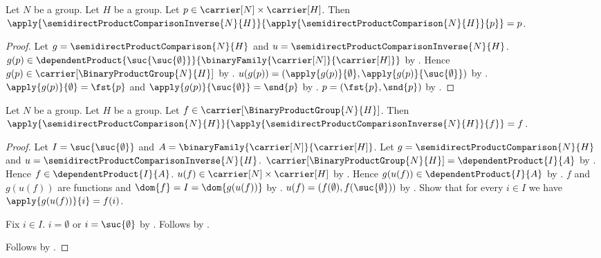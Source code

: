 \begin{proposition}\label{semidirect_product_comparison_inverse_left}
    Let $N$ be a group.
    Let $H$ be a group.
    Let $p\in\carrier[N]\times\carrier[H]$.
    Then
        $\apply{\semidirectProductComparisonInverse{N}{H}}
            {\apply{\semidirectProductComparison{N}{H}}{p}}=p$.
\end{proposition}
\begin{proof}
    Let $g=\semidirectProductComparison{N}{H}$ and
        $u=\semidirectProductComparisonInverse{N}{H}$.
    $g(p)\in\dependentProduct
        {\suc{\suc{\emptyset}}}
        {\binaryFamily{\carrier[N]}{\carrier[H]}}$ by
        .
    Hence $g(p)\in\carrier[\BinaryProductGroup{N}{H}]$ by
        .
    $u(g(p))=
        (\apply{g(p)}{\emptyset},\apply{g(p)}{\suc{\emptyset}})$ by
        .
    $\apply{g(p)}{\emptyset}=\fst{p}$ and
        $\apply{g(p)}{\suc{\emptyset}}=\snd{p}$ by
        .
    $p=(\fst{p},\snd{p})$ by
        .
\end{proof}

\begin{proposition}\label{semidirect_product_comparison_inverse_right}
    Let $N$ be a group.
    Let $H$ be a group.
    Let $f\in\carrier[\BinaryProductGroup{N}{H}]$.
    Then
        $\apply{\semidirectProductComparison{N}{H}}
            {\apply{\semidirectProductComparisonInverse{N}{H}}{f}}=f$.
\end{proposition}
\begin{proof}
    Let $I=\suc{\suc{\emptyset}}$ and
        $A=\binaryFamily{\carrier[N]}{\carrier[H]}$.
    Let $g=\semidirectProductComparison{N}{H}$ and
        $u=\semidirectProductComparisonInverse{N}{H}$.
    $\carrier[\BinaryProductGroup{N}{H}]=\dependentProduct{I}{A}$ by
        .
    Hence $f\in\dependentProduct{I}{A}$.
    $u(f)\in\carrier[N]\times\carrier[H]$ by
        .
    Hence $g(u(f))\in\dependentProduct{I}{A}$ by
        .
    $f$ and $g(u(f))$ are functions and
        $\dom{f}=I=\dom{g(u(f))}$ by
        .
    $u(f)=(f(\emptyset),f(\suc{\emptyset}))$ by
        .
    Show that for every $i\in I$ we have
        $\apply{g(u(f))}{i}=f(i)$.
    \begin{subproof}
        Fix $i\in I$.
        $i=\emptyset$ or $i=\suc{\emptyset}$ by
            .
        Follows by
            .
    \end{subproof}
    Follows by .
\end{proof}

